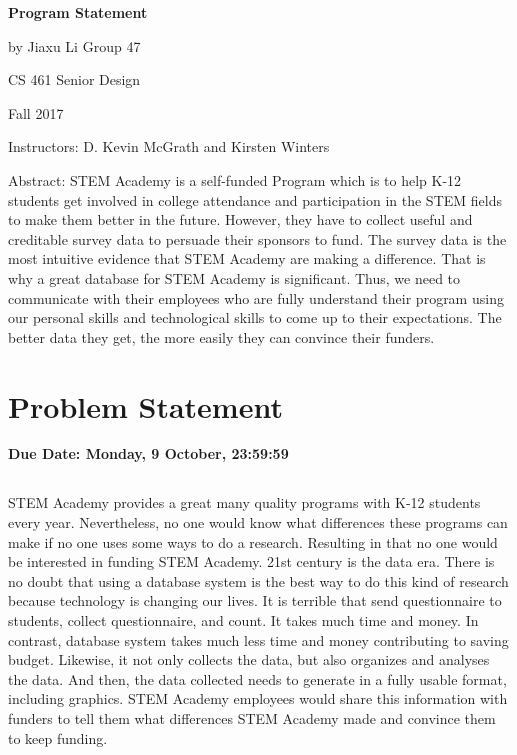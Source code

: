 \documentclass[letterpaper,10pt,draftclsnofoot,onecolumn]{IEEEtran}
\begin{document}
\begin{titlepage}
		
		\begin{center}
		\bigbreak	
		\textbf{Program Statement}
	
  	by Jiaxu Li Group 47
   
		CS 461 Senior Design 
    
    Fall 2017
    
    Instructors: D. Kevin McGrath  and   Kirsten Winters
		\end{center}
		
		Abstract:
    STEM Academy is a self-funded Program which is to help K-12 students get involved in college attendance and participation in the STEM fields to make them better in the future. However, they have to collect useful and creditable survey data to persuade their sponsors to fund. The survey data is the most intuitive evidence that STEM Academy are making a difference. That is why a great database for STEM Academy is significant. Thus, we need to communicate with their employees who are fully understand their program using our personal skills and technological skills to come up to their expectations. The better data they get, the more easily they can convince their funders.
\end{titlepage}
\tableofcontents



\section*{Problem Statement}
\textbf{Due Date: Monday, 9 October, 23:59:59}

\subsection*{ }
STEM Academy provides a great many quality programs with K-12 students every year. Nevertheless, no one would know what differences these programs can make if no one uses some ways to do a research. Resulting in that no one would be interested in funding STEM Academy.  21st century is the data era. There is no doubt that using a database system is the best way to do this kind of research because technology is changing our lives. It is terrible that send questionnaire to students, collect questionnaire, and count. It takes much time and money. In contrast, database system takes much less time and money contributing to saving budget. Likewise, it not only collects the data, but also organizes and analyses the data. And then, the data collected needs to generate in a fully usable format, including graphics. STEM Academy employees would share this information with funders to tell them what differences STEM Academy made and convince them to keep funding. 
\end{document}

